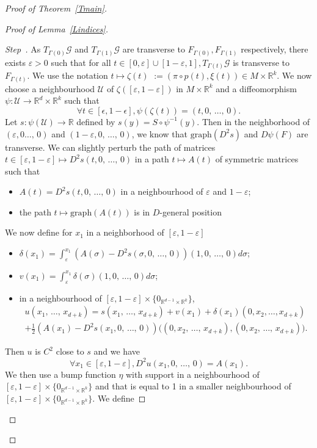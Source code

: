 \documentclass[10pt,a4paper]{amsart}
\numberwithin{equation}{section}
\newcommand*\cg{\mathcal{G}}
\newcommand*\cU{\mathcal{U}}
\newcommand*\cal{\mathcal}
\newcommand{\Graph}{\mathrm{graph}}
\newcommand*\R{\mathbb{R}}
\newcounter{stepcount}
\newenvironment{step}{\refstepcounter{stepcount}\begin{proof}[Step~\thestepcount]}{\let\qed\relax\end{proof}}
\let\oldforall\forall
\renewcommand*{\forall}{\mathrel{\oldforall}}
\theoremstyle{definition}
\theoremstyle{remark}
\begin{document}
\begin{proof}[Proof of Theorem~\ref{Tmain}]
\begin{proof}[Proof of Lemma~\ref{Lindices}]
\begin{step}\label{step1}
As $T_{\Gamma(0)}\cg$ and $T_{\Gamma(1)}\cg$ are transverse to $F_{\Gamma(0)},F_{\Gamma(1)}$ respectively, there exists $\varepsilon>0$ such that for all $ t\in [0, \varepsilon]\cup[1-\varepsilon, 1], T_{\Gamma(t)}\cg$ is transverse to $F_{\Gamma(t)}$. We use the notation $t\mapsto \zeta(t)$ $ := (\pi\circ p(t), \xi(t))\in M\times \R^k$. We now choose a neighbourhood $\cal U$ of {$\zeta([\varepsilon, 1-\varepsilon])$} in $M\times \R^k$ and a diffeomorphism $\psi: \cal U\rightarrow \R^d\times \R^k$ such that
\[
\forall t\in [\epsilon,1-\epsilon],
{\psi(\zeta (t))}=(t, 0,\, \dots,\, 0).
\]
Let $s:\psi(\cU)\rightarrow \R$ defined by $s(y)=S\circ \psi^{-1}(y)$. Then in the neighborhood of $(\varepsilon, 0\dots,\,0)$ and $(1-\varepsilon, 0,\,\dots,\,0)$, we know that $\Graph(D^2s)$ and $D\psi(F)$ are transverse. We can slightly perturb the path of matrices $t\in [\varepsilon, 1-\varepsilon]\mapsto D^2s(t, 0,\,\dots,\,0)$ in a path $t\mapsto A(t)$ of symmetric matrices such that
\begin{itemize}
\item $A(t)=D^2s(t, 0,\,\dots,\,0)$ in a neighbourhood of $\varepsilon$ and $1-\varepsilon$;
\item the path $t\mapsto \Graph(A(t))$ is in $D$-general position
\end{itemize}
We now define for $x_1$ in a neighborhood of $[\varepsilon, 1-\varepsilon]$
\begin{itemize}
\item $\delta(x_1)=\int_\varepsilon^{x_1}(A(\sigma)-D^2s(\sigma, 0,\,\dots,\,0))(1, 0,\, \dots,\, 0)d\sigma$;
\item $v(x_1)=\int_\varepsilon ^{x_1}\delta(\sigma)(1,0,\,\dots,\,0)d\sigma$;
\item in a neighbourhood of $[\varepsilon, 1-\varepsilon]\times \{ 0_{\R^{d-1}\times \R^k}\}$,
\begin{multline*}
u\left(x_1,\,\dots,\,x_{d+k}\right)=s\left(x_1,\,\dots,\,x_{d+k}\right)+v(x_1)+\delta(x_1)\left(0,x_2, \dots, x_{d+k}\right)
\\
+\frac{1}{2}(A(x_1)-D^2s(x_1,0,\,\dots,\,0))\big((0, x_2, \,\dots,\,x_{d+k}), (0, x_2, \,\dots,\, x_{d+k})\big).
\end{multline*}
\end{itemize}
Then $u$ is $C^2$ close to $s$ and we have
\[
\forall x_1\in [\varepsilon, 1-\varepsilon], D^2u(x_1, 0,\,\dots,\,0)=A(x_1).
\]
We then use a bump function $\eta$ with support in a neighbourhood of $[\varepsilon, 1-\varepsilon]\times \{ 0_{\R^{d-1}\times \R^k}\}$ and that is equal to 1 in a smaller neighbourhood of $[\varepsilon, 1-\varepsilon]\times \{ 0_{\R^{d-1}\times \R^k}\}$. We define

\end{step}
\end{proof}
\end{proof}
\end{document}
